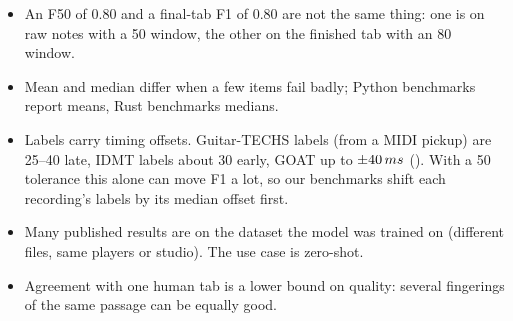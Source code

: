 \begin{caution}
\begin{itemize}
\item An F50 of 0.80 and a final-tab F1 of 0.80 are not the same thing: one is
  on raw notes with a 50\ms{} window, the other on the finished tab with an
  80\ms{} window.
\item Mean and median differ when a few items fail badly; Python benchmarks
  report means, Rust benchmarks medians.
\item Labels carry timing offsets. Guitar-TECHS labels (from a MIDI pickup) are
  25--40\ms{} late, IDMT labels about 30\ms{} early, GOAT up to $\pm40\,ms$
  \measured{} (). With a 50\ms{} tolerance this alone can
  move F1 a lot, so our benchmarks shift each recording's labels by its median
  offset first.
\item Many published results are on the dataset the model was trained on
  (different files, same players or studio). The use case is zero-shot.
\item Agreement with one human tab is a lower bound on quality: several
  fingerings of the same passage can be equally good.
\end{itemize}
\end{caution}
